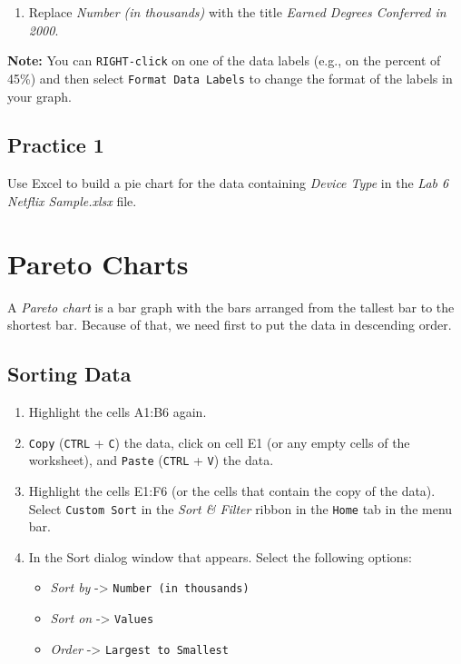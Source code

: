 \documentclass[
]{book}
\providecommand{\tightlist}{%
  \setlength{\itemsep}{0pt}\setlength{\parskip}{0pt}}
\begin{document}
\begin{enumerate}
\def\labelenumi{\arabic{enumi}.}
\setcounter{enumi}{6}
\tightlist
\item
  Replace \emph{Number (in thousands)} with the title \emph{Earned Degrees Conferred in 2000}.
\end{enumerate}

\textbf{Note:} You can \texttt{RIGHT-click} on one of the data labels (e.g., on the percent of 45\%) and then select \texttt{Format\ Data\ Labels} to change the format of the labels in your graph.

\hypertarget{practice-1-4}{%
\subsection{Practice 1}\label{practice-1-4}}

Use Excel to build a pie chart for the data containing \emph{Device Type} in the \emph{Lab 6 Netflix Sample.xlsx} file.

\hypertarget{pareto-charts}{%
\section{Pareto Charts}\label{pareto-charts}}

A \emph{Pareto chart} is a bar graph with the bars arranged from the tallest bar to the shortest bar. Because of that, we need first to put the data in descending order.

\hypertarget{sorting-data-1}{%
\subsection{Sorting Data}\label{sorting-data-1}}

\begin{enumerate}
\def\labelenumi{\arabic{enumi}.}
\tightlist
\item
  Highlight the cells A1:B6 again.
\item
  \texttt{Copy} (\texttt{CTRL} + \texttt{C}) the data, click on cell E1 (or any empty cells of the worksheet), and \texttt{Paste} (\texttt{CTRL} + \texttt{V}) the data.
\item
  Highlight the cells E1:F6 (or the cells that contain the copy of the data). Select \texttt{Custom\ Sort} in the \emph{Sort \& Filter} ribbon in the \texttt{Home} tab in the menu bar.
\item
  In the Sort dialog window that appears. Select the following options:

  \begin{itemize}
  \tightlist
  \item
    \emph{Sort by} -\textgreater{} \texttt{Number\ (in\ thousands)}
  \item
    \emph{Sort on} -\textgreater{} \texttt{Values}
  \item
    \emph{Order} -\textgreater{} \texttt{Largest\ to\ Smallest}
  \end{itemize}
\end{enumerate}
\end{document}

